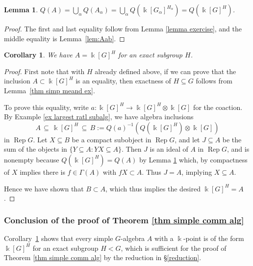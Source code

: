 \documentclass[11pt]{amsart}
\def\bk{\Bbbk}
\def\Rep{\operatorname{Rep}}
\def\sub{\subseteq}
\newtheorem{cor}[thm]{Corollary}
\newtheorem{lemma}[thm]{Lemma}
\theoremstyle{definition}
\theoremstyle{remark}
\numberwithin{equation}{section}
\begin{document}
	\begin{lemma}\label{lemma ratl fnts equal}
		$Q(A)=\bigcup_{\alpha} Q(A_{\alpha})=\bigcup_{\alpha}Q(\Bbbk[G_{\alpha}]^{H_\alpha})=Q(\Bbbk[G]^H)$.
	\end{lemma}
	
	\begin{proof}
		The first and last equality follow from Lemma \ref{lemma exercise}, and the middle equality is Lemma~\ref{lem:Aab}.
	\end{proof}


\begin{cor}\label{cor obs}
		We have $A=\Bbbk[G]^H$ for an exact subgroup $H$.
	\end{cor}
    \begin{proof}
    First note that with $H$ already defined above, if we can prove that the inclusion $A\subset\bk[G]^H$ is an equality, then exactness of $H\sub G$ follows from Lemma~\ref{thm simp meand ex}.

To prove this equality, write $a:\Bbbk[G]^H\to\Bbbk[G]^H\otimes\Bbbk[G]$ for the coaction. By Example \ref{ex largest ratl subalg}, we have algebra inclusions 
        \[A\,\sub\, \bk[G]^H \,\sub\, B:=Q(a)^{-1}(Q(\Bbbk[G]^H)\otimes\Bbbk[G])\]
        in $\Rep G$.  Let $X\sub B$ be a compact subobject in $\Rep G$, and let $J\sub A$ be the sum of the objects in $\{Y\sub A:YX\sub A\}$.  Then $J$ is an ideal of $A$ in $\Rep G$, and is nonempty because $Q(\Bbbk[G]^H)=Q(A)$ by Lemma \ref{lemma ratl fnts equal} which, by compactness of $X$ implies there is $f\in\Gamma(A)$ with $fX\subset A$.  Thus $J=A$, implying $X\sub A$.

        Hence we have shown that $B\subset A$, which thus implies the desired $\Bbbk[G]^H=A$.  
    \end{proof}
    
    
    
	


\subsubsection{Conclusion of the proof of Theorem \ref{thm simple comm alg}}

Corollary~\ref{cor obs} shows that every simple $G$-algebra $A$ with a $\bk$-point is of the form $\bk[G]^H$ for an exact subgroup $H<G$, which is sufficient for the proof of Theorem \ref{thm simple comm alg} by the reduction in \S \ref{reduction}.
\end{document}
